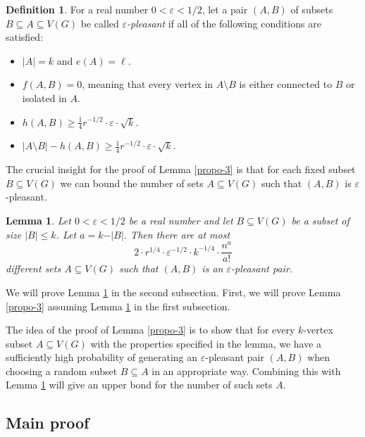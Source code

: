 \documentclass[11pt]{article}
\newtheorem{lemma}[theorem]{Lemma}
\theoremstyle{definition}
\newtheorem{definition}[theorem]{Definition}
\numberwithin{equation}{section}
\begin{document}
\begin{definition}\label{defi-pleasant}For a real number $0<\varepsilon<1/2$, let a pair $(A,B)$ of subsets $B\subseteq A\subseteq V(G)$ be called \emph{$\varepsilon$-pleasant} if all of the following conditions are satisfied:
\begin{itemize}
\item[(i)] $\vert A\vert=k$ and $e(A)=\ell$.
\item[(ii)] $f(A,B)=0$, meaning that every vertex in $A\setminus B$ is either connected to $B$ or isolated in $A$.
\item[(iii)] $h(A,B)\geq \frac{1}{4}r^{-1/2}\cdot \varepsilon\cdot \sqrt{k}$.
\item[(iv)] $\vert A\setminus B\vert-h(A,B)\geq \frac{1}{4}r^{-1/2}\cdot \varepsilon\cdot \sqrt{k}$.
\end{itemize}
\end{definition}

The crucial insight for the proof of Lemma \ref{propo-3} is that for each fixed subset $B\subseteq V(G)$ we can bound the number of sets $A\subseteq V(G)$ such that $(A,B)$ is $\varepsilon$-pleasant.

\begin{lemma}\label{lemma-B-pleasant-bound}Let $0<\varepsilon<1/2$ be a real number and let $B\subseteq V(G)$ be a subset of size $\vert B\vert\leq k$. Let $a=k-\vert B\vert$. Then there are at most 
\[2\cdot r^{1/4}\cdot \varepsilon^{-1/2}\cdot k^{-1/4}\cdot \frac{n^a}{a!}\]
different sets $A\subseteq V(G)$ such that $(A,B)$ is an $\varepsilon$-pleasant pair.
\end{lemma}

We will prove Lemma \ref{lemma-B-pleasant-bound} in the second subsection. First, we will prove Lemma \ref{propo-3} assuming Lemma \ref{lemma-B-pleasant-bound} in the first subsection.

The idea of the proof of Lemma \ref{propo-3} is to show that for every $k$-vertex subset $A\subseteq V(G)$ with the properties specified in the lemma, we have a sufficiently high probability of generating an $\varepsilon$-pleasant pair $(A,B)$ when choosing a random subset $B\subseteq A$ in an appropriate way. Combining this with Lemma \ref{lemma-B-pleasant-bound} will give an upper bond for the number of such sets $A$.

\subsection{Main proof}
\end{document}
